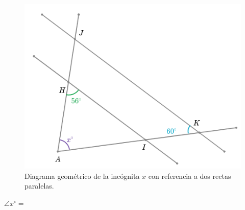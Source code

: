 \begin{minipage}[b]{0.42\textwidth}
    \begin{figure}[H]
        \includegraphics[width=\linewidth]{Images/triangle_angle_04}
        \caption{Diagrama geométrico de la inc\'ognita $x$ con referencia a dos rectas paralelas.}
        \label{fig:triangle_angle_04}
    \end{figure}
    \begin{center}
        {\color{purplePoint}\textbf{$\angle x^\circ =$}} \fbox{
            \begin{minipage}{2cm}
                \hfill\vspace{0.5cm}
            \end{minipage}
        }
    \end{center}

\end{minipage}
